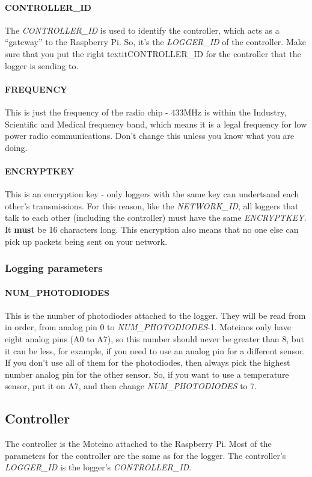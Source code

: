 \documentclass[10pt]{article}
\begin{document}
\paragraph{CONTROLLER\_ID}
The \textit{CONTROLLER\_ID} is used to identify the controller, which acts as a ``gateway'' to the Raspberry Pi. So, it's the \textit{LOGGER\_ID} of the controller. Make
sure that you put the right textit{CONTROLLER\_ID} for the controller that the logger is sending to.

\paragraph{FREQUENCY}
This is just the frequency of the radio chip - 433MHz is within the Industry, Scientific and Medical frequency band, which means it is a legal frequency for low power
radio communications. Don't change this unless you know what you are doing.

\paragraph{ENCRYPTKEY}
This is an encryption key - only loggers with the same key can undertsand each other's transmissions. For this reason, like the \textit{NETWORK\_ID}, all loggers that
talk to each other (including the controller) must have the same \textit{ENCRYPTKEY}. It \textbf{must} be 16 characters long. This encryption also means that no one
else can pick up packets being sent on your network.

\subsubsection{Logging parameters}

\paragraph{NUM\_PHOTODIODES}
This is the number of photodiodes attached to the logger. They will be read from in order, from analog pin 0 to \textit{NUM\_PHOTODIODES}-1. Moteinos only have eight analog pins (A0 to A7), so this number should never be greater than 8, but it can be less, for example, if you need to use an analog pin for a different sensor. If you don't use all of them for the photodiodes, then always pick the highest number analog pin for the other sensor. So, if you want to use a temperature sensor, put it on A7, and then change \textit{NUM\_PHOTODIODES} to 7.

\subsection{Controller}
The controller is the Moteino attached to the Raspberry Pi. Most of the parameters for the controller are the same as for the logger. The controller's \textit{LOGGER\_ID} is the logger's \textit{CONTROLLER\_ID}. 
\end{document}
